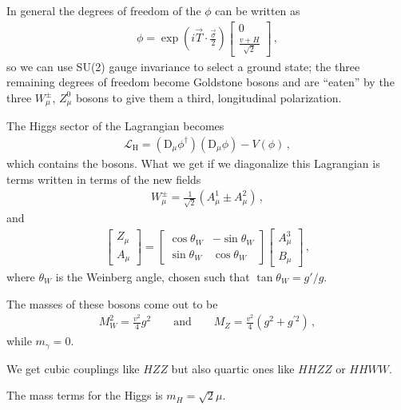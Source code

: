 \documentclass[main.tex]{subfiles}
\begin{document}
In general the degrees of freedom of the \(\phi \) can be written as 
%
\begin{align}
\phi = \exp(i \vec{T} \cdot \frac{\vec{\sigma}}{2}) \left[\begin{array}{c}
0 \\ 
\frac{v + H}{\sqrt{2}}
\end{array}\right]
\,,
\end{align}
%
so we can use SU(2) gauge invariance to select a ground state; the three remaining degrees of freedom become Goldstone bosons and are ``eaten'' by the three \(W^{\pm}_{\mu }\), \(Z^{0}_{\mu }\) bosons to give them a third, longitudinal polarization. 

The Higgs sector of the Lagrangian becomes 
%
\begin{align}
\mathscr{L} _{\text{H}} = \left( \text{D}_\mu \phi ^\dag\right)
\left( \text{D}_\mu \phi \right) - V(\phi )
\,,
\end{align}
%
which contains the bosons. 
What we get if we diagonalize this Lagrangian is terms written in terms of the new fields
%
\begin{align}
W^{\pm}_{\mu } = \frac{1}{\sqrt{2}} \left( A^{1}_{\mu } \pm A^{2}_{\mu } \right)
\,,
\end{align}
%
and 
%
\begin{align}
\left[\begin{array}{c}
Z_\mu  \\ 
A_\mu 
\end{array}\right]
= \left[\begin{array}{cc}
\cos \theta _W & - \sin \theta _W \\ 
\sin \theta _W & \cos \theta _W
\end{array}\right]
\left[\begin{array}{c}
A^{3}_{\mu } \\ 
B_\mu 
\end{array}\right]
\,,
\end{align}
%
where \(\theta _W\) is the Weinberg angle, chosen such that \(\tan \theta _W = g' / g\). 

The masses of these bosons come out to be 
%
\begin{align}
M_W^2 = \frac{v^2}{4} g^2 \qquad \text{and} \qquad
M_Z = \frac{v^2}{4} (g^2 + g^{\prime 2})
\,,
\end{align}
%
while \(m_\gamma = 0\). 

We get cubic couplings like \(HZZ\) but also quartic ones like \(HHZZ\) or \(HHWW\). 

The mass terms for the Higgs is \(m_H = \sqrt{2} \mu \). 
\end{document}
